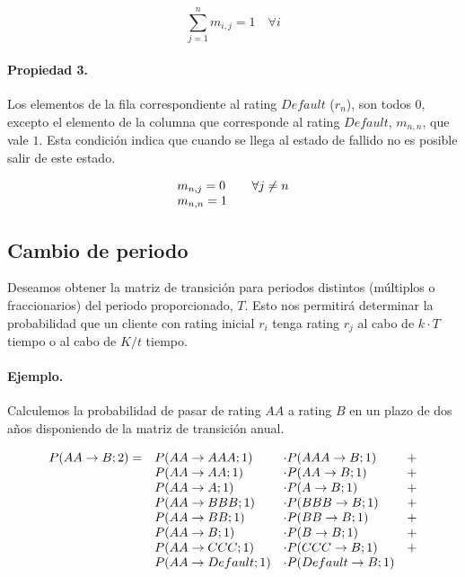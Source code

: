 \begin{displaymath}
\sum_{j=1}^{n} m_{i,j} = 1 \quad \forall i
\end{displaymath}

\paragraph{Propiedad 3.}
Los elementos de la fila correspondiente al rating $Default$ ($r_n$), son todos 
$0$, excepto el elemento de la columna que corresponde al rating $Default$, 
$m_{n,n}$, que vale $1$. Esta condici\'on indica que cuando se llega al estado 
de fallido no es posible salir de este estado.

\begin{displaymath}
\begin{array}{ll}
m_{n,j} = 0        & \quad \forall j \neq n \cr
m_{n,n} = 1
\end{array}
\end{displaymath}


\subsection{Cambio de periodo}

Deseamos obtener la matriz de transici\'on para periodos distintos (m\'ultiplos o 
fraccionarios) del periodo proporcionado, $T$. Esto nos permitir\'a determinar la 
probabilidad que un cliente con rating inicial $r_i$ tenga rating $r_j$ al cabo 
de $k \cdot T$ tiempo o al cabo de $K/t$ tiempo.

\paragraph{Ejemplo.} Calculemos la probabilidad de pasar de rating $AA$ a
rating $B$ en un plazo de dos a\~nos disponiendo de la matriz de transici\'on anual.

\begin{displaymath}
\begin{array}{llll}
P(AA \to B;2) = & P(AA \to AAA;1)     & \cdot P(AAA \to B;1)     & + \cr
                & P(AA \to AA;1)      & \cdot P(AA \to B;1)      & + \cr
                & P(AA \to A;1)       & \cdot P(A \to B;1)       & + \cr
                & P(AA \to BBB;1)     & \cdot P(BBB \to B;1)     & + \cr
                & P(AA \to BB;1)      & \cdot P(BB \to B;1)      & + \cr
                & P(AA \to B;1)       & \cdot P(B \to B;1)       & + \cr
                & P(AA \to CCC;1)     & \cdot P(CCC \to B;1)     & + \cr
                & P(AA \to Default;1) & \cdot P(Default \to B;1) &
\end{array}
\end{displaymath}

